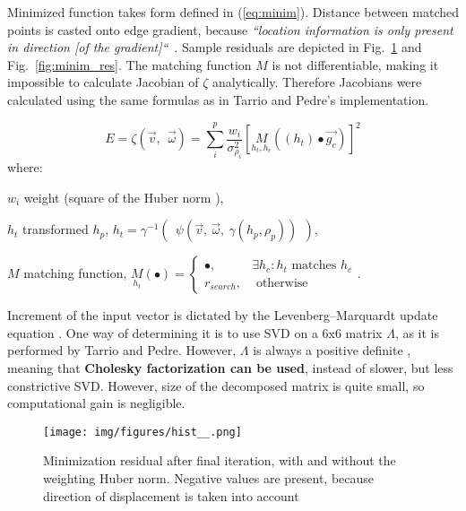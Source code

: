 Minimized function takes form defined in (\ref{eq:minim}). Distance between matched points is casted onto edge gradient, because \textit{``location information is only present in direction [of the gradient]``}~\cite{jose2015realtime}. Sample residuals are depicted in Fig.~\ref{fig:minim_hist} and Fig.~\ref{fig:minim_res}. The matching function $M$ is not differentiable, making it impossible to calculate Jacobian of $\zeta$ analytically. Therefore Jacobians were calculated using the same formulas as in Tarrio and Pedre's implementation.

\begin{equation}
E = \zeta \left( \vec{v},\ \ \vec{\omega} \right) = \sum_{i}^{p} \frac{w_i}{\sigma_{\rho_{i}}^2} \left[ \underset{h_t, h_c}{M} \left( \left( h_t \right) \bullet \vec{g_c} \right) \right] ^2
\label{eq:minim}
\end{equation}
where:
\begin{eqwhere}[2cm]
	\item[$w_i$] weight (square of the Huber norm \cite{huber1964robust}),
	\item[$h_t$] transformed $h_p$, $h_{t} = \gamma^{-1}\left(\ \  \psi \left( \vec{v},\ \vec{\omega},\ \gamma \left( h_p, \rho_{p} \right) \right)\ \  \right)$,
	\item[$M$] matching function, $\underset{h_t}{M}(\bullet) = \begin{cases} 
	\bullet, & \exists h_c : h_t \textrm{ matches } h_c \\
	r_{search}, & \textrm{ otherwise }
	\end{cases}$.
\end{eqwhere}


Increment of the input vector is dictated by the Levenberg–Marquardt update equation \cite{press2007numerical}. One way of determining it is to use SVD on a 6x6 matrix $\Lambda$, as it is performed by Tarrio and Pedre. However, $\Lambda$ is always a positive definite \cite{madsen2004methods}, meaning that \textbf{Cholesky factorization can be used}, instead of slower, but less constrictive SVD. However, size of the decomposed matrix is quite small, so computational gain is negligible.

\begin{figure}[ht]
	\centering\texttt{[image: img/figures/hist\_\_.png]}
	\caption{ Minimization residual after final iteration, with and without the weighting Huber norm. Negative values are present, because direction of displacement is taken into account }
	\label{fig:minim_hist}
\end{figure}


